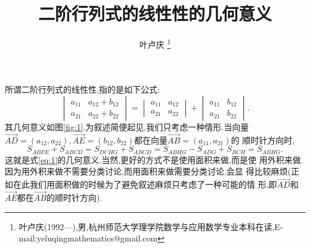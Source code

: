 \documentclass[a4paper]{article}
\newcommand{\ov}{\overrightarrow}
\begin{document}
\title{\huge{\bf{二阶行列式的线性性的几何意义}}} \author{\small{叶卢庆
    \footnote{叶卢庆(1992---),男,杭州师范大学理学院数学与应用数学专业本科在读,E-mail:yeluqingmathematics@gmail.com}}}
\maketitle
所谓二阶行列式的线性性,指的是如下公式:
\begin{equation}
  \label{eq:1}
  \begin{vmatrix}
    a_{11}&a_{12}+b_{12}\\
a_{21}&a_{22}+b_{22}
  \end{vmatrix}=
  \begin{vmatrix}
    a_{11}&a_{12}\\
a_{21}&a_{22}
  \end{vmatrix}+
  \begin{vmatrix}
    a_{11}&b_{12}\\
a_{21}&b_{22}
  \end{vmatrix}.
\end{equation}
其几何意义如图\eqref{fig:1}.为叙述简便起见,我们只考虑一种情形.当向量$\ov{AD}=(a_{12},a_{22}),\ov{AE}=(b_{12},b_{22})$都在向量$\ov{AB}=(a_{11},a_{21})$的
顺时针方向时,
$$
S_{ABFE}+S_{ABCD}=S_{DCHG}+S_{ABCD}=S_{ABHG}-S_{ADG}+S_{BCH}=S_{ABHG}.
$$
这就是式\eqref{eq:1}的几何意义.当然,更好的方式不是使用面积来做,而是使
用外积来做.因为用外积来做不需要分类讨论,而用面积来做需要分类讨论,会显
得比较麻烦(正如在此我们用面积做的时候为了避免叙述麻烦只考虑了一种可能的情
形,即$\ov{AD}$和$\ov{AE}$都在$\ov{AB}$的顺时针方向).\\
\end{document}
